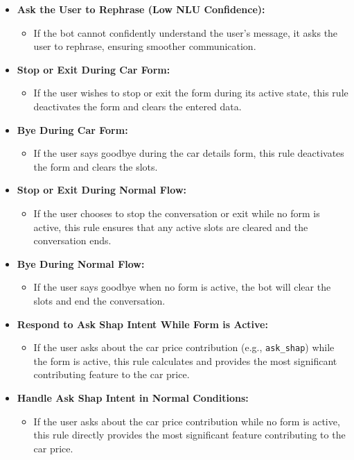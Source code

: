 \documentclass[a4paper,12pt]{article}
\begin{document}
\begin{itemize}
	\item \textbf{Ask the User to Rephrase (Low NLU Confidence):}
	\begin{itemize}
		\item If the bot cannot confidently understand the user's message, it asks the user to rephrase, ensuring smoother communication.
	\end{itemize}
	
	\item \textbf{Stop or Exit During Car Form:}
	\begin{itemize}
		\item If the user wishes to stop or exit the form during its active state, this rule deactivates the form and clears the entered data.
	\end{itemize}
	
	\item \textbf{Bye During Car Form:}
	\begin{itemize}
		\item If the user says goodbye during the car details form, this rule deactivates the form and clears the slots.
	\end{itemize}
	
	\item \textbf{Stop or Exit During Normal Flow:}
	\begin{itemize}
		\item If the user chooses to stop the conversation or exit while no form is active, this rule ensures that any active slots are cleared and the conversation ends.
	\end{itemize}
	
	\item \textbf{Bye During Normal Flow:}
	\begin{itemize}
		\item If the user says goodbye when no form is active, the bot will clear the slots and end the conversation.
	\end{itemize}
	
	\item \textbf{Respond to Ask Shap Intent While Form is Active:}
	\begin{itemize}
		\item If the user asks about the car price contribution (e.g., \texttt{ask\_shap}) while the form is active, this rule calculates and provides the most significant contributing feature to the car price.
	\end{itemize}
	
	\item \textbf{Handle Ask Shap Intent in Normal Conditions:}
	\begin{itemize}
		\item If the user asks about the car price contribution while no form is active, this rule directly provides the most significant feature contributing to the car price.
	\end{itemize}
\end{itemize}
\end{document}

